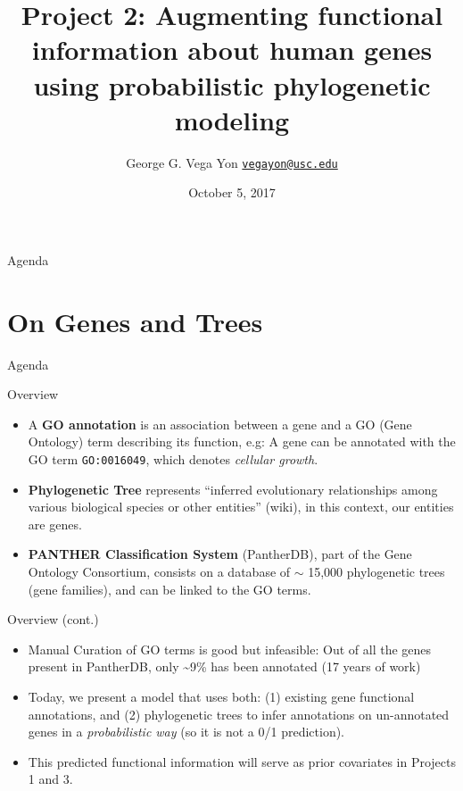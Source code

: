 \documentclass[9pt,handout,ignorenonframetext,]{beamer}
\title{Project 2: Augmenting functional information about human genes using
probabilistic phylogenetic modeling}
\author[
Vega Yon
]{George G. Vega Yon
\linebreak[4] \href{mailto:vegayon@usc.edu}{\nolinkurl{vegayon@usc.edu}}}
\institute[USC]{Department of Preventive Medicine \and University of Southern California}
\date{October 5, 2017}
\begin{document}

\begin{frame}{Agenda}

\tableofcontents{}

\end{frame}

\section{On Genes and Trees}\label{on-genes-and-trees}

\begin{frame}{Agenda}

\tableofcontents[currentsection]

\end{frame}

\begin{frame}[fragile]{Overview}

\begin{itemize}
\item
  A \textbf{GO annotation} is an association between a gene and a GO
  (Gene Ontology) term describing its function, e.g: A gene can be
  annotated with the GO term \texttt{GO:0016049}, which denotes
  \emph{cellular growth}.\pause
\item
  \textbf{Phylogenetic Tree} represents ``inferred evolutionary
  relationships among various biological species or other entities''
  (wiki), in this context, our entities are genes.\pause
\item
  \textbf{PANTHER Classification System} (PantherDB), part of the Gene
  Ontology Consortium, consists on a database of \(\sim\) 15,000
  phylogenetic trees (gene families), and can be linked to the GO terms.
\end{itemize}

\end{frame}

\begin{frame}{Overview (cont.)}

\begin{itemize}
\item
  Manual Curation of GO terms is good but infeasible: \pause Out of all
  the genes present in PantherDB, only \textasciitilde{}9\% has been
  annotated (17 years of work)\pause
\item
  Today, we present a model that uses both: (1) existing gene functional
  annotations, and (2) phylogenetic trees to infer annotations on
  un-annotated genes in a \emph{probabilistic way} (so it is not a 0/1
  prediction).\pause
\item
  This predicted functional information will serve as prior covariates
  in Projects 1 and 3.
\end{itemize}

\end{frame}
\end{document}
